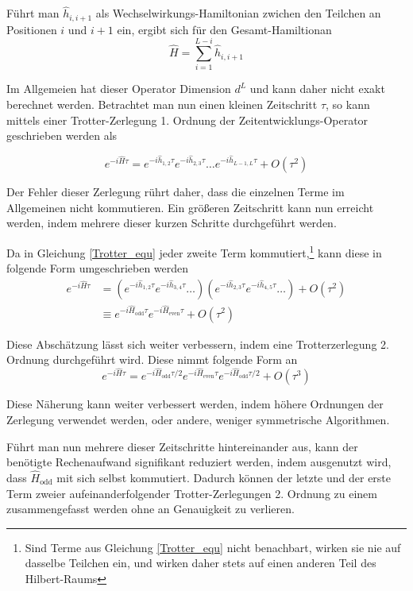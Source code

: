 \documentclass[10pt,a4paper]{report}
\begin{document}
Führt man $\hat{h}_{i,i+1}$ als Wechselwirkungs-Hamiltonian zwichen den Teilchen an Positionen $i$ und $i+1$ ein, ergibt sich für den Gesamt-Hamiltionan
\begin{equation}
\hat{H}=\sum_{i=1}^{L-i}\hat{h}_{i,i+1}
\end{equation}

Im Allgemeien hat dieser Operator Dimension $d^L$ und kann daher nicht exakt berechnet werden. Betrachtet man nun einen kleinen Zeitschritt $\tau$, so kann mittels einer Trotter-Zerlegung 1. Ordnung der Zeitentwicklungs-Operator geschrieben werden als

\begin{equation}\label{Trotter_equ}
e^{-i\hat{H}\tau}= e^{-i\hat{h}_{1,2}\tau}e^{-i\hat{h}_{2,3}\tau}\ldots e^{-i\hat{h}_{L-1,L}\tau}+O(\tau^2)
\end{equation}

Der Fehler dieser Zerlegung rührt daher, dass die einzelnen Terme im Allgemeinen nicht kommutieren. Ein größeren Zeitschritt kann nun erreicht werden, indem mehrere dieser kurzen Schritte durchgeführt werden.

Da in Gleichung \ref{Trotter_equ} jeder zweite Term kommutiert,\footnote{Sind Terme aus Gleichung \ref{Trotter_equ} nicht benachbart, wirken sie nie auf dasselbe Teilchen ein, und wirken daher stets auf einen anderen Teil des Hilbert-Raums} kann diese in folgende Form umgeschrieben werden
\begin{equation}
\begin{split}
e^{-i\hat{H}\tau}&=(e^{-i\hat{h}_{1,2}\tau}e^{-i\hat{h}_{3,4}\tau}\ldots)(e^{-i\hat{h}_{2,3}\tau}e^{-i\hat{h}_{4,5}\tau}\ldots)+O(\tau^2)\\
&\equiv e^{-i\hat{H}_{\text{odd}}\tau}e^{-i\hat{H}_{\text{even}}\tau}+O(\tau^2)
\end{split}
\end{equation}

Diese Abschätzung lässt sich weiter verbessern, indem eine Trotterzerlegung 2. Ordnung durchgeführt wird. Diese nimmt folgende Form an
\begin{equation}
e^{-i\hat{H}\tau}=e^{-i\hat{H}_{\text{odd}}\tau/2}e^{-i\hat{H}_{\text{even}}\tau}e^{-i\hat{H}_{\text{odd}}\tau/2}+O(\tau^3)
\end{equation}

Diese Näherung kann weiter verbessert werden, indem höhere Ordnungen der Zerlegung verwendet werden, oder andere, weniger symmetrische Algorithmen.

Führt man nun mehrere dieser Zeitschritte hintereinander aus, kann der benötigte Rechenaufwand signifikant reduziert werden, indem ausgenutzt wird, dass $\hat{H}_{\text{odd}}$ mit sich selbst kommutiert. Dadurch können der letzte und der erste Term zweier aufeinanderfolgender Trotter-Zerlegungen 2. Ordnung zu einem zusammengefasst werden ohne an Genauigkeit zu verlieren.\par
\end{document}
